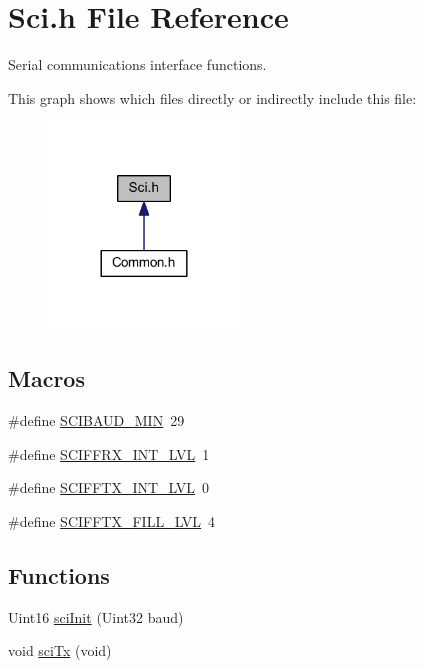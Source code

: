 \hypertarget{a00040}{\section{Sci.\-h File Reference}
\label{a00040}
}


Serial communications interface functions.  


This graph shows which files directly or indirectly include this file\-:\nopagebreak
\begin{figure}[H]
\begin{center}
\leavevmode
\includegraphics[width=144pt]{a00072}
\end{center}
\end{figure}
\subsection*{Macros}
\begin{DoxyCompactItemize}
\item 
\#define \hyperlink{a00040_a0e4c420431b12616b61e9f3a28f07e4d}{S\-C\-I\-B\-A\-U\-D\-\_\-\-M\-I\-N}~29
\item 
\#define \hyperlink{a00040_a5733933fffc18dbcb8bc9404e80bc493}{S\-C\-I\-F\-F\-R\-X\-\_\-\-I\-N\-T\-\_\-\-L\-V\-L}~1
\item 
\#define \hyperlink{a00040_a5340c9de55b8e5c65ef801d2dcabffd7}{S\-C\-I\-F\-F\-T\-X\-\_\-\-I\-N\-T\-\_\-\-L\-V\-L}~0
\item 
\#define \hyperlink{a00040_af0368b1c16e194a32bf4ce09eb937930}{S\-C\-I\-F\-F\-T\-X\-\_\-\-F\-I\-L\-L\-\_\-\-L\-V\-L}~4
\end{DoxyCompactItemize}
\subsection*{Functions}
\begin{DoxyCompactItemize}
\item 
Uint16 \hyperlink{a00040_a1f05b9c5226c73b67c1d6c3bf7f80b52}{sci\-Init} (Uint32 baud)
\item 
void \hyperlink{a00040_a941bdbf3e64ac5f4492a7f7c5936b445}{sci\-Tx} (void)
\end{DoxyCompactItemize}


